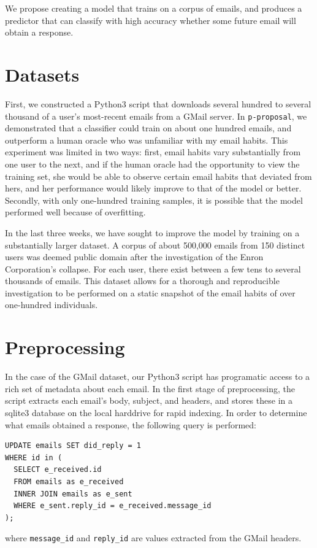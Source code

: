 \documentclass[10pt]{article}
\begin{document}
We propose creating a model that trains on a corpus of emails, and produces a predictor that can classify with high accuracy whether some future email will obtain a response.


\section*{Datasets}

First, we constructed a Python3 script that downloads several hundred to several thousand of a user's most-recent emails from a GMail server. In \texttt{p-proposal}, we demonstrated that a classifier could train on about one hundred emails, and outperform a human oracle who was unfamiliar with my email habits. This experiment was limited in two ways: first, email habits vary substantially from one user to the next, and if the human oracle had the opportunity to view the training set, she would be able to observe certain email habits that deviated from hers, and her performance would likely improve to that of the model or better. Secondly, with only one-hundred training samples, it is possible that the model performed well because of overfitting.

In the last three weeks, we have sought to improve the model by training on a substantially larger dataset. A corpus of about 500,000 emails from 150 distinct users was deemed public domain after the investigation of the Enron Corporation's collapse\cite{enroncorpus}. For each user, there exist between a few tens to several thousands of emails. This dataset allows for a thorough and reproducible investigation to be performed on a static snapshot of the email habits of over one-hundred individuals.

\section*{Preprocessing}

In the case of the GMail dataset, our Python3 script has programatic access to a rich set of metadata about each email. In the first stage of preprocessing, the script extracts each email's body, subject, and headers, and stores these in a sqlite3 database on the local harddrive for rapid indexing. In order to determine what emails obtained a response, the following query is performed:
\begin{verbatim}
UPDATE emails SET did_reply = 1
WHERE id in (
  SELECT e_received.id
  FROM emails as e_received
  INNER JOIN emails as e_sent
  WHERE e_sent.reply_id = e_received.message_id
);
\end{verbatim}
%
where \texttt{message\_id} and \texttt{reply\_id} are values extracted from the GMail headers.
\end{document}
